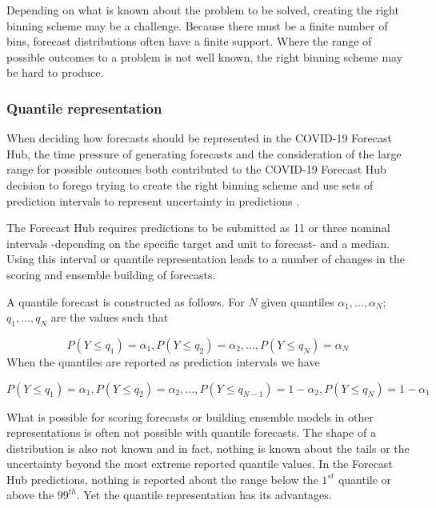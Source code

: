 \documentclass[11pt,notitlepage]{isuthesis}
\begin{document}
Depending on what is known about the problem to be solved, creating the right 
binning scheme may be a challenge. Because there must be a finite number of
bins, forecast distributions often have a finite support. Where the range of 
possible outcomes to a problem is not well known, the right binning scheme may 
be
hard to produce.









\subsubsection{Quantile representation}
When deciding how forecasts should be represented in the COVID-19 Forecast Hub,
the time pressure of generating forecasts and the consideration of the large
range for possible outcomes both contributed to the COVID-19 Forecast Hub 
decision
to forego trying to create the right binning scheme and use sets of prediction
intervals to represent uncertainty in predictions \cite{bracher2021evaluating}.

The Forecast Hub requires predictions to be submitted as 11 or three nominal 
intervals -depending on the specific target and unit to forecast- and a median.
Using this interval or quantile representation leads to a number of changes in 
the scoring and ensemble building of forecasts.

A quantile forecast is constructed as follows.
For $N$ given quantiles $\alpha_1,..., \alpha_N$; $q_1,..., q_N$ are the values
such that 

\begin{equation}
\label{eq:quantiles}
  P(Y \leq q_1) = \alpha_1, P(Y \leq q_2) = \alpha_2, ..., 
  P(Y \leq q_N) = \alpha_N
\end{equation}
When the quantiles are reported as prediction intervals we have

\begin{equation}
\label{eq:intervals}
  P(Y \leq q_1) = \alpha_1, P(Y \leq q_2) = \alpha_2, ...,
  P(Y \leq q_{N-1}) = 1 - \alpha_2, P(Y \leq q_N) = 1 - \alpha_1
\end{equation}

What is possible for scoring forecasts
or building ensemble models in other representations is often not possible with
quantile forecasts. The shape of a distribution is also not known and in fact,
nothing is known about the tails or the uncertainty beyond the most 
extreme reported quantile values. In the Forecast Hub predictions, nothing 
is reported about the range below the $1^{st}$ quantile or above the $99^{th}$.
Yet the quantile representation has its advantages. 
\end{document}
